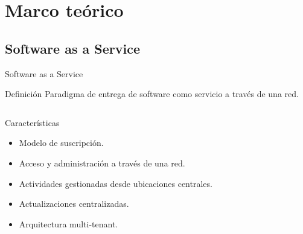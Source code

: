 \documentclass[10pt,xcolor=table]{beamer}
\begin{document}
\section{Marco teórico}
\subsection{Software as a Service}
\begin{frame}{Software as a Service}
	\begin{alertblock}{Definición}
		Paradigma de entrega de software como servicio a través de una red.
	\end{alertblock}

	\begin{columns}[c,onlytextwidth]
		\begin{block}{Características}
			\begin{itemize}
	        	\item Modelo de suscripción.
	        	\item Acceso y administración a través de una red.
	        	\item Actividades gestionadas desde ubicaciones centrales.
	        	\item Actualizaciones centralizadas.
	      		\item Arquitectura multi-tenant.
	    	\end{itemize}
		\end{block}
		\begin{figure}[H]

\end{figure}
\end{columns}
\end{frame}
\end{document}
